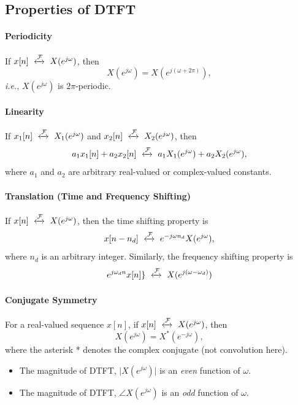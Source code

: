\subsection{Properties of DTFT}

\paragraph{Periodicity}  If $x[n] \ \xleftrightarrow[]{\mathcal{F}} \ X(e^{j\omega})$, then
\[
    X(e^{j\omega}) =  X(e^{j (\omega+2\pi)}),
\]
\textit{i.e.}, $X(e^{j\omega})$ is $2\pi$-periodic.

\paragraph{Linearity} If $x_1[n] \ \xleftrightarrow[]{\mathcal{F}} \ X_1(e^{j\omega})$ and $x_2[n] \ \xleftrightarrow[]{\mathcal{F}} \ X_2(e^{j\omega})$, then 
\[
    a_1 x_1 [n] + a_2 x_2 [n] \ \xleftrightarrow[]{\mathcal{F}} \ a_1 X_1(e^{j\omega}) + a_2 X_2(e^{j\omega}),
\]
where $a_1$ and $a_2$ are arbitrary real-valued or complex-valued constants.

\paragraph{Translation (Time and Frequency Shifting)} If $x[n] \ \xleftrightarrow[]{\mathcal{F}} \ X(e^{j\omega})$, then the time shifting property is
\[
    x[n - n_{d}] \ \xleftrightarrow[]{\mathcal{F}} \ e^{-j\omega n_{d}} X(e^{j\omega}),
\]
where $n_d$ is an arbitrary integer. Similarly, the frequency shifting property is
\[
    e^{j\omega_d n} x[n]\}  \ \xleftrightarrow[]{\mathcal{F}} \ X(e^{j(\omega-\omega_d)})
\]


\paragraph{Conjugate Symmetry} 
For a real-valued sequence $x[n]$, if $x[n] \ \xleftrightarrow[]{\mathcal{F}} \ X(e^{j\omega})$, then
\[
    X(e^{j\omega}) = X^{*}(e^{-j\omega}), 
\]
where the asterisk * denotes the complex conjugate (not convolution here).

\begin{itemize}
    \item The magnitude of DTFT, $\lvert X(e^{j\omega}) \rvert$ is an \textit{even} function of $\omega$.

    \item The magnitude of DTFT, $\angle X(e^{j\omega})$ is an \textit{odd} function of $\omega$.
\end{itemize}

